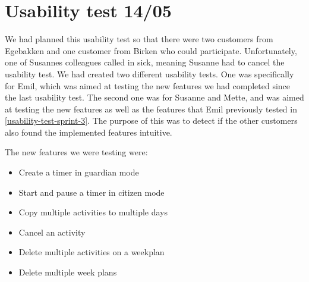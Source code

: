 \section{Usability test 14/05}
We had planned this usability test so that there were two customers from Egebakken and one customer from Birken who could participate.
Unfortunately, one of Susannes colleagues called in sick, meaning Susanne had to cancel the usability test.
We had created two different usability tests. 
One was specifically for Emil, which was aimed at testing the new features we had completed since the last usability test.
The second one was for Susanne and Mette, and was aimed at testing the new features as well as the features that Emil previously tested in \autoref{usability-test-sprint-3}. 
The purpose of this was to detect if the other customers also found the implemented features intuitive.

The new features we were testing were:

\begin{itemize}
  \item Create a timer in guardian mode
  \item Start and pause a timer in citizen mode
  \item Copy multiple activities to multiple days
  \item Cancel an activity
  \item Delete multiple activities on a weekplan
  \item Delete multiple week plans
\end{itemize}



